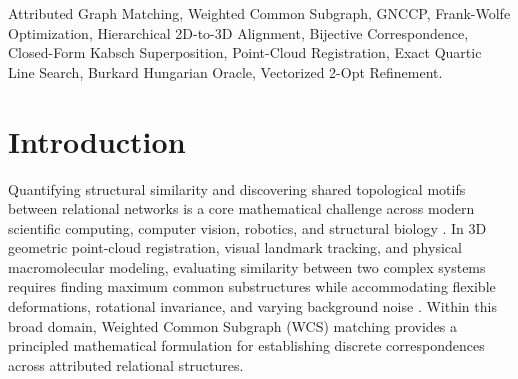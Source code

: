 \documentclass[conference]{IEEEtran}
\begin{document}
\begin{abstract}
relaxations and $\mathcal{O}(N^{4.3})$ for classical spectral methods, running $19.3\times$ faster than RLX1 and scaling up to $M = 60$ in sub-$25\,\text{ms}$ with up to $97.1\%$ matching accuracy. On an extensive 28-configuration $(N, L)$ grid sweep spanning $N \in [20, 150]$ and $L/N \in [0.4, 1.0]$, Fast-WCS v3 executes in $52.2\,\text{ms}$ at $N=100$ ($10.5\times$ faster than RLX1F) and $206.7\,\text{ms}$ at $N=150$ ($165.4\times$ faster than RLX1F). On physical 3D geometric point-cloud superposition benchmarks across 100 multi-seed trials evaluated with untrimmed full-atom RMSD, Fast-WCS achieves $41.6\%\text{--}44.0\%$ accuracy with $\mathbf{37.0\%\text{--}42.0\%}$ sub-angstrom docking success ($< 1.0\,\text{\AA}$) and $26.0\%\text{--}27.0\%$ ultra-precision ($< 0.1\,\text{\AA}$) in $7.4\text{--}8.3\,\text{ms}$, whereas optimal transport and quadratic assignment baselines (POT, FGW, SciPy FAQ) completely fail ($0.0\text{--}1.0\%$ sub-angstrom recovery, median RMSD $> 2.7\,\text{\AA}$). Finally, on large-scale graphs up to $N = 100$, Fast-WCS evaluates in $140.0\,\text{ms}$ compared to $800.5\,\text{s}$ for numerical finite differences ($\mathbf{5,717.9\times}$ acceleration), establishing an efficient, mathematically rigorous foundation for hierarchical 2D graph matching and 3D physical superposition.
\end{abstract}

\begin{IEEEkeywords}
Attributed Graph Matching, Weighted Common Subgraph, GNCCP, Frank-Wolfe Optimization, Hierarchical 2D-to-3D Alignment, Bijective Correspondence, Closed-Form Kabsch Superposition, Point-Cloud Registration, Exact Quartic Line Search, Burkard Hungarian Oracle, Vectorized 2-Opt Refinement.
\end{IEEEkeywords}


\section{Introduction}
\label{sec:intro}

Quantifying structural similarity and discovering shared topological motifs between relational networks is a core mathematical challenge across modern scientific computing, computer vision, robotics, and structural biology \cite{conte2004, emmert2007}. In 3D geometric point-cloud registration, visual landmark tracking, and physical macromolecular modeling, evaluating similarity between two complex systems requires finding maximum common substructures while accommodating flexible deformations, rotational invariance, and varying background noise \cite{zaslavskiy2009, vishwanathan2010, leordeanu2005}. Within this broad domain, Weighted Common Subgraph (WCS) matching provides a principled mathematical formulation for establishing discrete correspondences across attributed relational structures.
\end{document}
